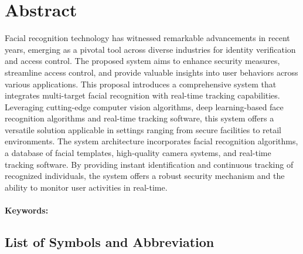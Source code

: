 \chapter*{Abstract}
\normalsize
Facial recognition technology has witnessed remarkable advancements in recent years, emerging as a pivotal tool across diverse industries for identity verification and access control.  The proposed system aims to enhance security measures, streamline access control, and provide valuable insights into user behaviors across various applications. This proposal introduces a comprehensive system that integrates multi-target facial recognition with real-time tracking capabilities. Leveraging cutting-edge computer vision algorithms, deep learning-based face
recognition algorithms and real-time tracking software, this system offers a versatile solution applicable in settings ranging from secure facilities to retail environments.
       The system architecture incorporates facial recognition algorithms, a database of facial templates, high-quality camera systems, and real-time tracking software. By providing instant identification and continuous tracking of recognized individuals, the system offers a robust security mechanism and the ability to monitor user activities in real-time.\\
\\
\textbf{Keywords:}

	    \tableofcontents

		\listoffigures
\newpage
		\Large
			\begingroup
				\let\clearpage\relax
				\section*{List of Symbols and Abbreviation}
			\endgroup
		\normalsize

